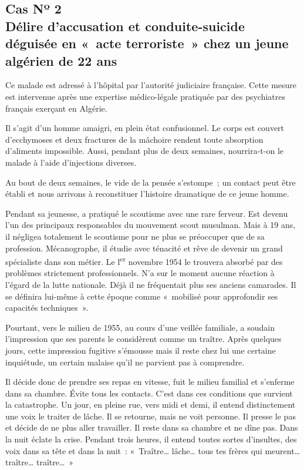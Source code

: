 \documentclass[french,twoside]{book} %
\begin{document}
\subsection[{Cas Nº 2. Délire d’accusation et conduite-suicide déguisée en « acte terroriste » chez un jeune algérien de 22 ans}]{Cas Nº 2 \\
Délire d’accusation et conduite-suicide déguisée en « acte terroriste » chez un jeune algérien de 22 ans}
\noindent Ce malade est adressé à l’hôpital par l’autorité judiciaire française. Cette mesure est intervenue après une expertise médico-légale pratiquée par des psychiatres français exerçant en Algérie.\par
 Il s’agit d’un homme amaigri, en plein état confusionnel. Le corps est couvert d’ecchymoses et deux fractures de la mâchoire rendent toute absorption d’aliments impossible. Aussi, pendant plus de deux semaines, nourrira-t-on le malade à l’aide d’injections diverses.\par
Au bout de deux semaines, le vide de la pensée s’estompe ; un contact peut être établi et nous arrivons à reconstituer l’histoire dramatique de ce jeune homme.\par
Pendant sa jeunesse, a pratiqué le scoutisme avec une rare ferveur. Est devenu l’un des principaux responsables du mouvement scout musulman. Mais à 19 ans, il négligea totalement le scoutisme pour ne plus se préoccuper que de sa profession. Mécanographe, il étudie avec ténacité et rêve de devenir un grand spécialiste dans son métier. Le l\textsuperscript{er} novembre 1954 le trouvera absorbé par des problèmes strictement professionnels. N’a sur le moment aucune réaction à l’égard de la lutte nationale. Déjà il ne fréquentait plus ses anciens camarades. Il se définira lui-même à cette époque comme « mobilisé pour approfondir ses capacités techniques ».\par
Pourtant, vers le milieu de 1955, au cours d’une veillée familiale, a soudain l’impression que ses parents le considèrent comme un traître. Après quelques jours, cette impression fugitive s’émousse mais il reste chez lui une certaine inquiétude, un certain malaise qu’il ne parvient pas à comprendre.\par
Il décide donc de prendre ses repas en vitesse, fuit le milieu familial et s’enferme dans sa chambre. Évite tous les contacts. C’est dans ces conditions que survient la catastrophe. Un jour, en pleine rue, vers midi et demi, il entend distinctement une voix le traiter de lâche. Il se retourne, mais ne voit personne. Il presse le pas et décide de ne plus aller travailler. Il reste dans sa chambre et ne dîne pas. Dans la nuit éclate la crise. Pendant trois heures, il entend toutes sortes d’insultes, des voix dans sa tête et dans la nuit : « Traître… lâche… tous tes frères qui meurent… traître… traître… »\par
\end{document}
